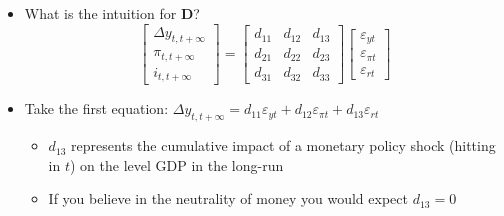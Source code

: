 \documentclass[10pt,handout]{beamer}
\begin{document}
\begin{frame}
\begin{itemize}
\item What is the intuition for $\mathbf{D}$?%
\begin{equation*}
\begin{bmatrix}
\Delta y_{t,t+\infty } \\ 
\pi _{t,t+\infty } \\ 
i_{t,t+\infty }%
\end{bmatrix}%
=\left[ 
\begin{array}{ccc}
d_{11} & d_{12} & d_{13} \\ 
d_{21} & d_{22} & d_{23} \\ 
d_{31} & d_{32} & d_{33}%
\end{array}%
\right] 
\begin{bmatrix}
\varepsilon _{yt} \\ 
\varepsilon _{\pi t} \\ 
\varepsilon _{rt}%
\end{bmatrix}%
\end{equation*}%
\pause

\item Take the first equation: $\Delta y_{t,t+\infty }=d_{11}\varepsilon
_{yt}+d_{12}\varepsilon _{\pi t}+d_{13}\varepsilon _{rt}$

\begin{itemize}
\item $d_{13}$ represents the cumulative {impact of a monetary policy shock
(hitting in }${t}${) on the level GDP} in the long-run

\item If you believe in the neutrality of money you would expect $d_{13}=0$
\end{itemize}
\end{itemize}
\end{frame}

\vspace{.1cm}
\end{document}
